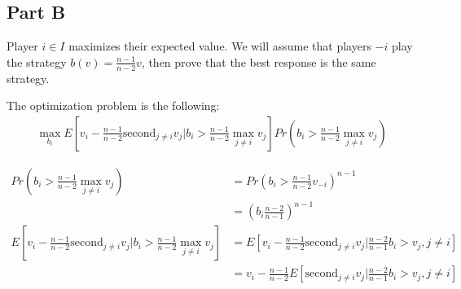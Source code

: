 \documentclass[11pt]{article} %
\begin{document}
\subsection{Part B}
Player $i\in I$ maximizes their expected value. We will assume that  players $-i$ play the strategy $b(v) = \frac{n-1}{n-2}v $, then prove that the best response is the same strategy.

The optimization problem is the following:
\begin{align*}
\max_{b_i}E[v_i - \frac{n-1}{n-2}\text{second}_{j \neq i}v_j|b_i>\frac{n-1}{n-2}\max_{j\neq i} v_j]Pr(b_i>\frac{n-1}{n-2}\max_{j\neq i} v_j) 
\end{align*}

\begin{align*}
Pr(b_i>\frac{n-1}{n-2}\max_{j\neq i} v_j) &= Pr\left(b_i>\frac{n-1}{n-2}v_{-i}\right)^{n-1}\\
&= \left(b_i\frac{n-2}{n-1}\right)^{n-1}\\
E[v_i - \frac{n-1}{n-2}\text{second}_{j \neq i}v_j|b_i>\frac{n-1}{n-2}\max_{j\neq i} v_j]  &= E[v_i - \frac{n-1}{n-2}\text{second}_{j \neq i}v_j|\frac{n-2}{n-1}b_i>v_{j}, j\neq i ] \\
&= v_i - \frac{n-1}{n-2}E[\text{second}_{j \neq i}v_j|\frac{n-2}{n-1}b_i>v_{j}, j\neq i ]
\end{align*}
\end{document}

